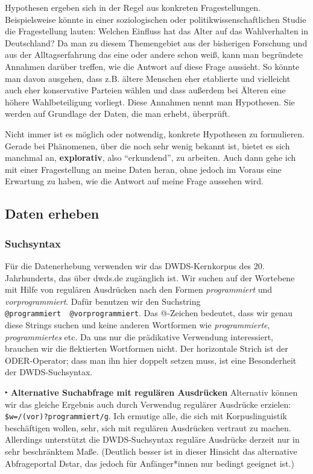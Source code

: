 \documentclass[]{article}
\begin{document}
Hypothesen ergeben sich in der Regel aus konkreten Fragestellungen.
Beispielsweise könnte in einer soziologischen oder
politikwissenschaftlichen Studie die Fragestellung lauten: Welchen
Einfluss hat das Alter auf das Wahlverhalten in Deutschland? Da man zu
diesem Themengebiet aus der bisherigen Forschung und aus der
Alltagserfahrung das eine oder andere schon weiß, kann man begründete
Annahmen darüber treffen, wie die Antwort auf diese Frage aussieht. So
könnte man davon ausgehen, dass z.B. ältere Menschen eher etablierte und
vielleicht auch eher konservative Parteien wählen und dass außerdem bei
Älteren eine höhere Wahlbeteiligung vorliegt. Diese Annahmen nennt man
Hypothesen. Sie werden auf Grundlage der Daten, die man erhebt,
überprüft.

Nicht immer ist es möglich oder notwendig, konkrete Hypothesen zu
formulieren. Gerade bei Phänomenen, über die noch sehr wenig bekannt
ist, bietet es sich manchmal an, \textbf{explorativ}, also
``erkundend'', zu arbeiten. Auch dann gehe ich mit einer Fragestellung
an meine Daten heran, ohne jedoch im Voraus eine Erwartung zu haben, wie
die Antwort auf meine Frage aussehen wird.

\subsection{Daten erheben}\label{daten-erheben}

\subsubsection{Suchsyntax}\label{suchsyntax}

Für die Datenerhebung verwenden wir das DWDS-Kernkorpus des 20.
Jahrhunderts, das über dwds.de zugänglich ist. Wir suchen auf der
Wortebene mit Hilfe von regulären Ausdrücken nach den Formen
\emph{programmiert} und \emph{vorprogrammiert}. Dafür benutzen wir den
Suchstring
\texttt{@programmiert\ \textbar{}\textbar{}\ @vorprogrammiert}. Das
@-Zeichen bedeutet, dass wir genau diese Strings suchen und keine
anderen Wortformen wie \emph{programmierte}, \emph{programmiertes} etc.
Da uns nur die prädikative Verwendung interessiert, brauchen wir die
flektierten Wortformen nicht. Der horizontale Strich \textbar{} ist der
ODER-Operator; dass man ihn hier doppelt setzen muss, ist eine
Besonderheit der DWDS-Suchsyntax.

‣ \textbf{Alternative Suchabfrage mit regulären Ausdrücken} Alternativ
können wir das gleiche Ergebnis auch durch Verwendug regulärer Ausdrücke
erzielen: \texttt{\$w=/(vor)?programmiert/g}. Ich ermutige alle, die
sich mit Korpuslinguistik beschäftigen wollen, sehr, sich mit regulären
Ausdrücken vertraut zu machen. Allerdings unterstützt die
DWDS-Suchsyntax reguläre Ausdrücke derzeit nur in sehr beschränktem
Maße. (Deutlich besser ist in dieser Hinsicht das alternative
Abfrageportal Dstar, das jedoch für Anfänger*innen nur bedingt geeignet
ist.)
\end{document}
